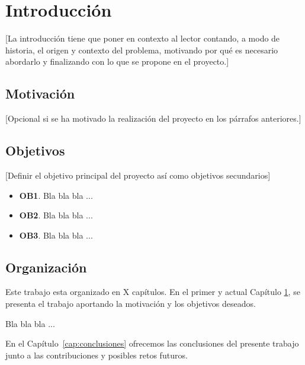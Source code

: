 \chapter{Introducción}\label{cap:introduccion}
[La introducción tiene que poner en contexto al lector contando, a modo de historia, el origen y contexto del problema, motivando por qué es necesario abordarlo y finalizando con lo que se propone en el proyecto.]
\section{Motivación}
[Opcional si se ha motivado la realización del proyecto en los párrafos anteriores.]

\section{Objetivos}\label{sec:objetivos}

[Definir el objetivo principal del proyecto así como objetivos secundarios]

\begin{itemize}
    \item \textbf{OB1}. Bla bla bla ...
    \item \textbf{OB2}. Bla bla bla ...
    \item \textbf{OB3}. Bla bla bla ...
\end{itemize}

\section{Organización}

Este trabajo esta organizado en X capítulos. En el primer y actual Capítulo \ref{cap:introduccion}, se presenta el trabajo aportando la motivación y los objetivos deseados.

Bla bla bla ...

En el Capítulo~\ref{cap:conclusiones} ofrecemos las conclusiones del presente trabajo junto a las contribuciones y posibles retos futuros.